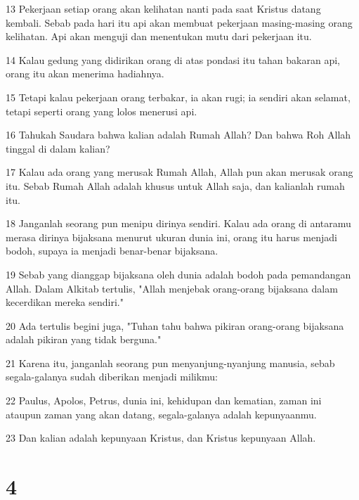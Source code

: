 \par 13 Pekerjaan setiap orang akan kelihatan nanti pada saat Kristus datang kembali. Sebab pada hari itu api akan membuat pekerjaan masing-masing orang kelihatan. Api akan menguji dan menentukan mutu dari pekerjaan itu.
\par 14 Kalau gedung yang didirikan orang di atas pondasi itu tahan bakaran api, orang itu akan menerima hadiahnya.
\par 15 Tetapi kalau pekerjaan orang terbakar, ia akan rugi; ia sendiri akan selamat, tetapi seperti orang yang lolos menerusi api.
\par 16 Tahukah Saudara bahwa kalian adalah Rumah Allah? Dan bahwa Roh Allah tinggal di dalam kalian?
\par 17 Kalau ada orang yang merusak Rumah Allah, Allah pun akan merusak orang itu. Sebab Rumah Allah adalah khusus untuk Allah saja, dan kalianlah rumah itu.
\par 18 Janganlah seorang pun menipu dirinya sendiri. Kalau ada orang di antaramu merasa dirinya bijaksana menurut ukuran dunia ini, orang itu harus menjadi bodoh, supaya ia menjadi benar-benar bijaksana.
\par 19 Sebab yang dianggap bijaksana oleh dunia adalah bodoh pada pemandangan Allah. Dalam Alkitab tertulis, "Allah menjebak orang-orang bijaksana dalam kecerdikan mereka sendiri."
\par 20 Ada tertulis begini juga, "Tuhan tahu bahwa pikiran orang-orang bijaksana adalah pikiran yang tidak berguna."
\par 21 Karena itu, janganlah seorang pun menyanjung-nyanjung manusia, sebab segala-galanya sudah diberikan menjadi milikmu:
\par 22 Paulus, Apolos, Petrus, dunia ini, kehidupan dan kematian, zaman ini ataupun zaman yang akan datang, segala-galanya adalah kepunyaanmu.
\par 23 Dan kalian adalah kepunyaan Kristus, dan Kristus kepunyaan Allah.

\chapter{4}

